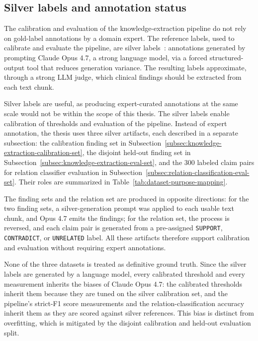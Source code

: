 \subsection{Silver labels and annotation status}\label{subsec:silver-labels-and-annotation-status}

The calibration and evaluation of the knowledge-extraction pipeline do not rely on gold-label annotations by a domain expert. The reference labels, used to calibrate and evaluate the pipeline, are silver labels~\parencite{zheng2023judgingllmasajudgemtbench}: annotations generated by prompting Claude Opus 4.7, a strong language model, via a forced structured-output tool that reduces generation variance. The resulting labels approximate, through a strong LLM judge, which clinical findings should be extracted from each text chunk.

Silver labels are useful, as producing expert-curated annotations at the same scale would not be within the scope of this thesis. The silver labels enable calibration of thresholds and evaluation of the pipeline. Instead of expert annotation, the thesis uses three silver artifacts, each described in a separate subsection: the calibration finding set in Subsection~\ref{subsec:knowledge-extraction-calibration-set}, the disjoint held-out finding set in Subsection~\ref{subsec:knowledge-extraction-eval-set}, and the 300 labeled claim pairs for relation classifier evaluation in Subsection~\ref{subsec:relation-classification-eval-set}. Their roles are summarized in Table~\ref{tab:dataset-purpose-mapping}.

The finding sets and the relation set are produced in opposite directions: for the two finding sets, a silver-generation prompt was applied to each usable text chunk, and Opus 4.7 emits the findings; for the relation set, the process is reversed, and each claim pair is generated from a pre-assigned \texttt{SUPPORT}, \texttt{CONTRADICT}, or \texttt{UNRELATED} label. All these artifacts therefore support calibration and evaluation without requiring expert annotations.

None of the three datasets is treated as definitive ground truth. Since the silver labels are generated by a language model, every calibrated threshold and every measurement inherits the biases of Claude Opus 4.7: the calibrated thresholds inherit them because they are tuned on the silver calibration set, and the pipeline's strict-F1 score measurements and the relation-classification accuracy inherit them as they are scored against silver references. This bias is distinct from overfitting, which is mitigated by the disjoint calibration and held-out evaluation split.